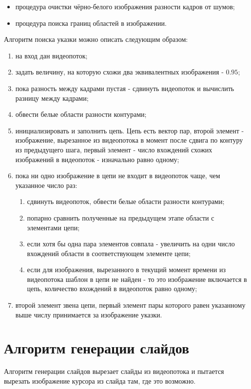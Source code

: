 \documentclass[oneside,final,14pt]{extreport}
\begin{document}
\begin{itemize}
\item процедура очистки чёрно-белого изображения разности кадров от шумов;
\item процедура поиска границ областей в изображении.
\end{itemize}


Алгоритм поиска указки можно описать следующим образом:

\begin{enumerate}
\item на вход дан видеопоток;
\item задать величину, на которую схожи два эквивалентных изображения - $0.95$;
\item пока разность между кадрами пустая - сдвинуть видеопоток и вычислить разницу между кадрами; 
\item обвести белые области разности контурами;
\item инициализировать и заполнить цепь. Цепь есть вектор пар, второй элемент - изображение, вырезанное из видеопотока в момент после сдвига  по контуру из предыдущего шага, первый элемент - число вхождений схожих изображений в видеопоток - изначально равно одному;
\item пока ни одно изображение в цепи не входит в видеопоток чаще, чем указанное число раз:
\begin{enumerate}
\item сдвинуть видеопоток, обвести белые области разности контурами;
\item попарно сравнить полученные на предыдущем этапе области с элементами цепи;
\item если хотя бы одна пара элементов совпала - увеличить на одни число вхождений области в соответствующем элементе цепи;
\item если для изображения, вырезанного в текущий момент времени из видеопотока шаблон в цепи не найден - то это изображение включается в цепь, количество вхождений в видеопоток равно одному;      
\end{enumerate}
\item второй элемент звена цепи, первый элемент пары которого равен указанному выше числу принимается за изображение указки.
\end{enumerate}

\section{Алгоритм генерации слайдов}
Алгоритм генерации слайдов вырезает слайды из видеопотока и пытается вырезать изображение курсора из слайда там, где это возможно.
\end{document}
